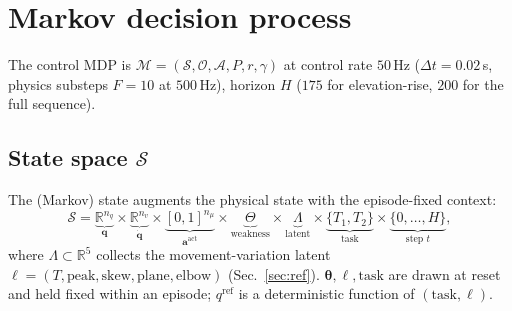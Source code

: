 \documentclass[11pt]{article}
\newcommand{\R}{\mathbb{R}}
\newcommand{\Obs}{\mathcal{O}}
\newcommand{\Act}{\mathcal{A}}
\newcommand{\St}{\mathcal{S}}
\newcommand{\qref}{q^{\mathrm{ref}}}
\renewcommand{\vec}[1]{\mathbf{#1}}
\begin{document}
\section{Markov decision process}
The control MDP is $\mathcal M=(\St,\Obs,\Act,P,r,\gamma)$ at control rate $50$\,Hz ($\Delta t{=}0.02$\,s, physics substeps $F{=}10$ at $500$\,Hz), horizon $H$ ($175$ for elevation-rise, $200$ for the full sequence).

\subsection{State space $\St$}
The (Markov) state augments the physical state with the episode-fixed context:
\begin{equation}
\St=\underbrace{\R^{n_q}}_{\vec q}\times\underbrace{\R^{n_v}}_{\dot{\vec q}}\times\underbrace{[0,1]^{n_\mu}}_{\vec a^{\mathrm{act}}}\times\underbrace{\Theta}_{\text{weakness}}\times\underbrace{\Lambda}_{\text{latent}}\times\underbrace{\{T_1,T_2\}}_{\text{task}}\times\underbrace{\{0,\dots,H\}}_{\text{step }t},
\end{equation}
where $\Lambda\subset\R^{5}$ collects the movement-variation latent $\boldsymbol\ell=(T,\mathrm{peak},\mathrm{skew},\mathrm{plane},\mathrm{elbow})$ (Sec.~\ref{sec:ref}). $\boldsymbol\theta,\boldsymbol\ell,\text{task}$ are drawn at reset and held fixed within an episode; $\qref$ is a deterministic function of $(\text{task},\boldsymbol\ell)$.
\end{document}
